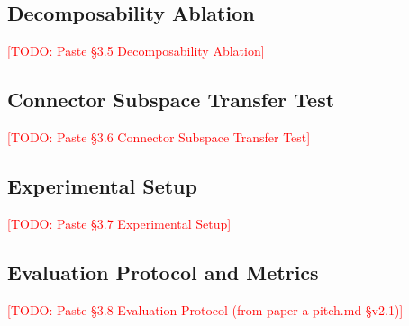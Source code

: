\documentclass{article}
\newcommand{\todo}[1]{\textcolor{red}{[TODO: #1]}}
\begin{document}
\subsection{Decomposability Ablation}
\label{sec:decomp}


\todo{Paste §3.5 Decomposability Ablation}

\subsection{Connector Subspace Transfer Test}
\label{sec:connector}


\todo{Paste §3.6 Connector Subspace Transfer Test}

\subsection{Experimental Setup}
\label{sec:setup}


\todo{Paste §3.7 Experimental Setup}

\subsection{Evaluation Protocol and Metrics}
\label{sec:eval}


\todo{Paste §3.8 Evaluation Protocol (from paper-a-pitch.md §v2.1)}

\end{document}
